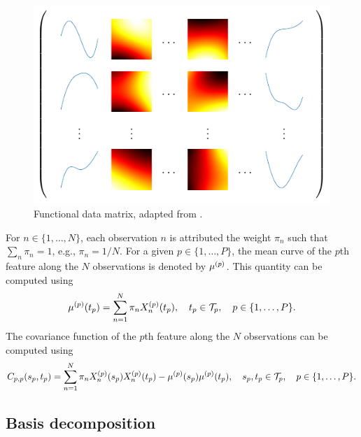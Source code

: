 \begin{figure}
    \centering
    \includegraphics[]{figures/data_matrix.pdf}
    \caption{Functional data matrix, adapted from \cite{berrenderoPrincipalComponentsMultivariate2011}.}
    \label{fig:data_matrix}
\end{figure}

For $n \in \{1, \dots, N\}$, each observation $n$ is attributed the weight $\pi_n$ such that $\sum_n \pi_n = 1$, e.g., $\pi_n = 1/N$.
For a given $p \in \{1, \dots, P\}$, the mean curve of the $p$th feature along the $N$ observations is denoted by $\mu^{(p)}$. This quantity can be computed using 
\begin{equation*}\label{eq:mu_estimation}
    \mu^{(p)}(t_p) = \sum_{n = 1}^N \pi_nX_n^{(p)}(t_p), \quad t_p \in \mathcal{T}_{p}, \quad p \in \{1, \dots, P\}.
\end{equation*}
The covariance function of the $p$th feature along the $N$ observations can be computed using
\begin{equation}\label{eq:cov_estimation}
    C_{p, p}(s_p, t_p) = \sum_{n = 1}^N \pi_nX_n^{(p)}(s_p)X_n^{(p)}(t_p) - \mu^{(p)}(s_p)\mu^{(p)}(t_p), \quad s_p, t_p \in \mathcal{T}_{p}, \quad p \in \{1, \dots, P\}.
\end{equation}

\subsection{Basis decomposition} %
\label{sub:basis_decomposition}


